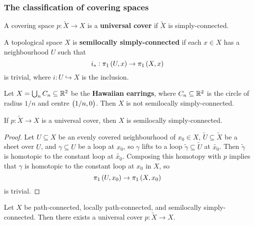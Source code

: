 \pagebreak

\subsubsection{The classification of covering spaces}


\begin{definition*}
A covering space $ p : \widetilde{X} \to X $ is a \textbf{universal cover} if $ \widetilde{X} $ is simply-connected.
\end{definition*}

\begin{definition*}
A topological space $ X $ is \textbf{semilocally simply-connected} if each $ x \in X $ has a neighbourhood $ U $ such that
$$ i_* : \pi_1\br{U, x} \to \pi_1\br{X, x} $$
is trivial, where $ i : U \hookrightarrow X $ is the inclusion.
\end{definition*}

\begin{example*}
Let $ X = \bigcup_n C_n \subseteq \mathbb{R}^2 $ be the \textbf{Hawaiian earrings}, where $ C_n \subseteq \mathbb{R}^2 $ is the circle of radius $ 1 / n $ and centre $ \br{1 / n, 0} $. Then $ X $ is not semilocally simply-connected.
\end{example*}

\begin{proposition}
If $ p : \widetilde{X} \to X $ is a universal cover, then $ X $ is semilocally simply-connected.
\end{proposition}

\begin{proof}
Let $ U \subseteq X $ be an evenly covered neighbourhood of $ x_0 \in X $, $ \widetilde{U} \subseteq \widetilde{X} $ be a sheet over $ U $, and $ \gamma \subseteq U $ be a loop at $ x_0 $, so $ \gamma $ lifts to a loop $ \widetilde{\gamma} \subseteq \widetilde{U} $ at $ \widetilde{x_0} $. Then $ \widetilde{\gamma} $ is homotopic to the constant loop at $ \widetilde{x_0} $. Composing this homotopy with $ p $ implies that $ \gamma $ is homotopic to the constant loop at $ x_0 $ in $ X $, so
$$ \pi_1\br{U, x_0} \to \pi_1\br{X, x_0} $$
is trivial.
\end{proof}

\begin{theorem}
Let $ X $ be path-connected, locally path-connected, and semilocally simply-connected. Then there exists a universal cover $ p : \widetilde{X} \to X $.
\end{theorem}


